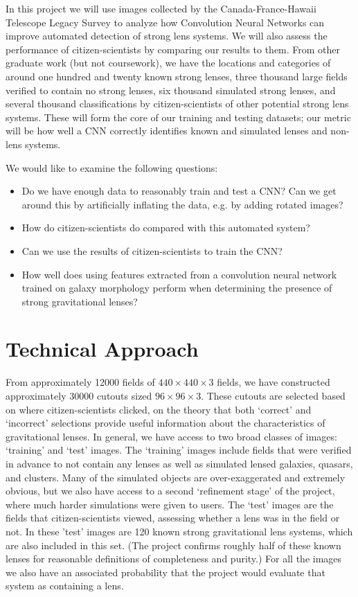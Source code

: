 \documentclass[10pt,twocolumn,letterpaper]{article}
\begin{document}
In this project we will use images collected by the Canada-France-Hawaii
Telescope Legacy Survey to analyze how Convolution Neural Networks can improve
automated detection of strong lens systems. We will also assess the performance
of citizen-scientists by comparing our results to them. From other graduate
work (but not coursework), we have the locations and categories of around one
hundred and twenty known strong lenses, three thousand large fields verified to
contain no strong lenses, six thousand simulated strong lenses, and several
thousand classifications by citizen-scientists of other potential strong lens
systems.  These will form the core of our training and testing datasets; our
metric will be how well a CNN correctly identifies known and simulated lenses
and non-lens systems.

We would like to examine the following questions:
\begin{itemize}
\item{ Do we have enough data to reasonably train and test a CNN? Can we get
       around this by artificially inflating the data, e.g. by adding rotated
     images?}
\item{ How do citizen-scientists do compared with this automated system?}
\item{ Can we use the results of citizen-scientists to train the CNN?}
\item{ How well does using features extracted from a convolution neural network
       trained on galaxy morphology perform when determining the presence of
     strong gravitational lenses?}
\end{itemize}


\section{Technical Approach}

From approximately 12000 fields of $440\times440\times3$ fields, we have
constructed approximately 30000 cutouts sized $96\times96\times3$. These
cutouts are selected based on where citizen-scientists clicked, on the theory
that both `correct' and `incorrect' selections provide useful information about
the characteristics of gravitational lenses. In general, we have access to two
broad classes of images: `training' and `test' images. The `training' images
include fields that were verified in advance to not contain any lenses as well
as simulated lensed galaxies, quasars, and clusters. Many of the simulated
objects are over-exaggerated and extremely obvious, but we also have access to
a second `refinement stage' of the project, where much harder simulations were
given to users. The `test' images are the fields that citizen-scientists
viewed, assessing whether a lens was in the field or not. In these 'test'
images are 120 known strong gravitational lens systems, which are also included
in this set. (The project confirms roughly half of these known lenses for
reasonable definitions of completeness and purity.) For all the images we also
have an associated probability that the project would evaluate that system as
containing a lens.
\end{document}

